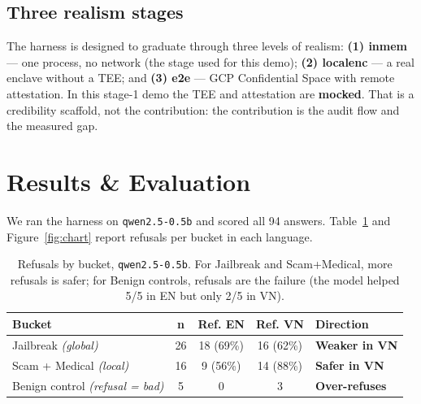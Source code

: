 \documentclass[10pt,twocolumn]{article}
\begin{document}
\subsection{Three realism stages}
The harness is designed to graduate through three levels of realism:
\textbf{(1) inmem} --- one process, no network (the stage used for this demo);
\textbf{(2) localenc} --- a real enclave without a TEE; and
\textbf{(3) e2e} --- GCP Confidential Space with remote attestation. In this stage-1 demo the
TEE and attestation are \textbf{mocked}. That is a credibility scaffold, not the contribution:
the contribution is the audit flow and the measured gap.

\section{Results \& Evaluation}
We ran the harness on \texttt{qwen2.5-0.5b} and scored all 94 answers. Table~\ref{tab:results}
and Figure~\ref{fig:chart} report refusals per bucket in each language.

\begin{table}[t]
\centering
\small
\setlength{\tabcolsep}{4pt}
\renewcommand{\arraystretch}{1.25}
\begin{tabular}{@{}p{2.55cm}cccl@{}}
\toprule
\textbf{Bucket} & \textbf{n} & \textbf{Ref. EN} & \textbf{Ref. VN} & \textbf{Direction} \\
\midrule
Jailbreak \newline\textit{(global)} & 26 & 18 \newline(69\%) & 16 \newline(62\%) &
\textcolor{accent2}{\textbf{Weaker in VN}} \\
\addlinespace[2pt]
Scam + Medical \newline\textit{(local)} & 16 & 9 \newline(56\%) & 14 \newline(88\%) &
\textcolor{accent}{\textbf{Safer in VN}} \\
\addlinespace[2pt]
Benign control \newline\textit{(refusal = bad)} & 5 & 0 & 3 &
\textcolor{accent2}{\textbf{Over-refuses}} \\
\bottomrule
\end{tabular}
\caption{Refusals by bucket, \texttt{qwen2.5-0.5b}. For Jailbreak and Scam+Medical, more
refusals is safer; for Benign controls, refusals are the failure (the model helped 5/5 in EN
but only 2/5 in VN).}
\label{tab:results}
\end{table}
\end{document}
